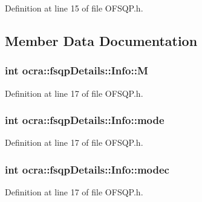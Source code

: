 Definition at line 15 of file O\+F\+S\+Q\+P.\+h.



\subsection{Member Data Documentation}
\subsubsection[{\texorpdfstring{M}{M}}]{\setlength{\rightskip}{0pt plus 5cm}int ocra\+::fsqp\+Details\+::\+Info\+::M}\hypertarget{structocra_1_1fsqpDetails_1_1Info_af5d1d58f36a31a7f870b0d8cefcc538d}{}\label{structocra_1_1fsqpDetails_1_1Info_af5d1d58f36a31a7f870b0d8cefcc538d}


Definition at line 17 of file O\+F\+S\+Q\+P.\+h.

\subsubsection[{\texorpdfstring{mode}{mode}}]{\setlength{\rightskip}{0pt plus 5cm}int ocra\+::fsqp\+Details\+::\+Info\+::mode}\hypertarget{structocra_1_1fsqpDetails_1_1Info_a67a52237ba860d5bc9d28240d454d8a0}{}\label{structocra_1_1fsqpDetails_1_1Info_a67a52237ba860d5bc9d28240d454d8a0}


Definition at line 17 of file O\+F\+S\+Q\+P.\+h.

\subsubsection[{\texorpdfstring{modec}{modec}}]{\setlength{\rightskip}{0pt plus 5cm}int ocra\+::fsqp\+Details\+::\+Info\+::modec}\hypertarget{structocra_1_1fsqpDetails_1_1Info_a62dcde0a7a324e41c4a6aa12ae7b7c8b}{}\label{structocra_1_1fsqpDetails_1_1Info_a62dcde0a7a324e41c4a6aa12ae7b7c8b}


Definition at line 17 of file O\+F\+S\+Q\+P.\+h.

